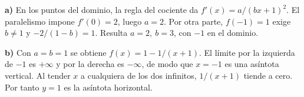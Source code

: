 \textbf{a)} En los puntos del dominio, la regla del cociente da
$f'(x)=a/(bx+1)^2$. El paralelismo impone $f'(0)=2$, luego $a=2$.
Por otra parte, $f(-1)=1$ exige $b\ne1$ y $-2/(1-b)=1$.
Resulta $\boxed{a=2,\ b=3}$, con $-1$ en el dominio.

\textbf{b)} Con $a=b=1$ se obtiene $f(x)=1-1/(x+1)$.
El límite por la izquierda de $-1$ es $+\infty$ y por la derecha es
$-\infty$, de modo que $\boxed{x=-1}$ es una asíntota vertical.
Al tender $x$ a cualquiera de los dos infinitos, $1/(x+1)$ tiende a
cero. Por tanto $\boxed{y=1}$ es la asíntota horizontal.
